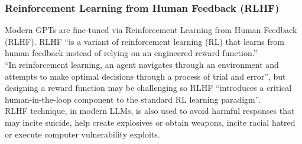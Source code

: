 \documentclass[12pt]{article}
\begin{document}

        \subsubsection{Reinforcement Learning from Human Feedback (RLHF)}

Modern GPTs are fine-tuned via Reinforcement Learning from Human Feedback (RLHF). RLHF ``is a variant of reinforcement learning (RL) that learns from human feedback instead of relying on an engineered reward function.''\cite{kaufmann2024surveyreinforcementlearninghuman}\\ ``In reinforcement learning, an agent navigates through an environment and attempts to make optimal decisions through a process of trial and error''\cite{kaufmann2024surveyreinforcementlearninghuman}, but designing a reward function may be challenging so RLHF ``introduces a critical human-in-the-loop component to the standard RL learning paradigm''.\cite{kaufmann2024surveyreinforcementlearninghuman}\\ RLHF technique, in modern LLMs, is also used to avoid harmful responses that may incite suicide, help create explosives or obtain weapons, incite racial hatred or execute computer vulnerability exploits.
\end{document}
